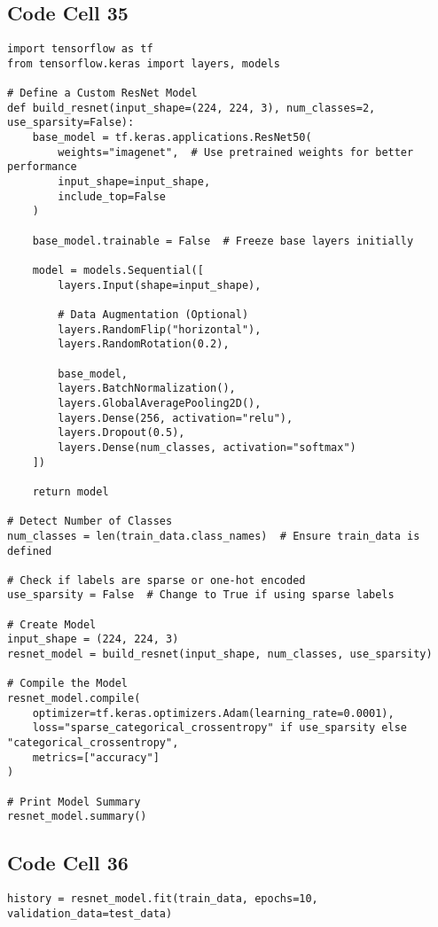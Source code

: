 \documentclass{article}
\begin{document}
\subsection*{Code Cell 35}
\begin{lstlisting}
import tensorflow as tf
from tensorflow.keras import layers, models

# Define a Custom ResNet Model
def build_resnet(input_shape=(224, 224, 3), num_classes=2, use_sparsity=False):
    base_model = tf.keras.applications.ResNet50(
        weights="imagenet",  # Use pretrained weights for better performance
        input_shape=input_shape,
        include_top=False
    )

    base_model.trainable = False  # Freeze base layers initially

    model = models.Sequential([
        layers.Input(shape=input_shape),

        # Data Augmentation (Optional)
        layers.RandomFlip("horizontal"),
        layers.RandomRotation(0.2),

        base_model,
        layers.BatchNormalization(),
        layers.GlobalAveragePooling2D(),
        layers.Dense(256, activation="relu"),
        layers.Dropout(0.5),
        layers.Dense(num_classes, activation="softmax")
    ])

    return model

# Detect Number of Classes
num_classes = len(train_data.class_names)  # Ensure train_data is defined

# Check if labels are sparse or one-hot encoded
use_sparsity = False  # Change to True if using sparse labels

# Create Model
input_shape = (224, 224, 3)
resnet_model = build_resnet(input_shape, num_classes, use_sparsity)

# Compile the Model
resnet_model.compile(
    optimizer=tf.keras.optimizers.Adam(learning_rate=0.0001),
    loss="sparse_categorical_crossentropy" if use_sparsity else "categorical_crossentropy",
    metrics=["accuracy"]
)

# Print Model Summary
resnet_model.summary()

\end{lstlisting}

\subsection*{Code Cell 36}
\begin{lstlisting}
history = resnet_model.fit(train_data, epochs=10, validation_data=test_data)
\end{lstlisting}
\end{document}
